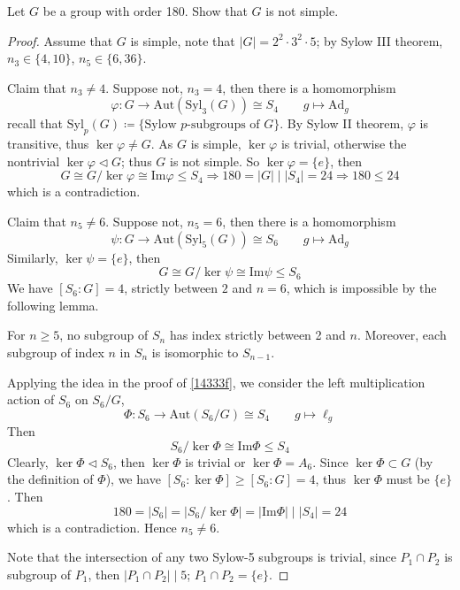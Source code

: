 \begin{exercise}
Let $G$ be a group with order 180. Show that $G$ is not simple.
\end{exercise}
\begin{proof}
Assume that $G$ is simple, note that $\lvert G \rvert=2^{2}\cdot3^2\cdot5$; by Sylow III theorem, $n_3\in \{ 4,10 \}$, $n_5\in \{ 6,36 \}$.

Claim that $n_3\neq4$. Suppose not, $n_3=4$, then there is a homomorphism
\[
\varphi:G\to \mathrm{Aut}(\mathrm{Syl}_{3}(G))\cong S_4\qquad g\mapsto \mathrm{Ad}_{g}
\]
recall that $\mathrm{Syl}_{p}(G)\coloneqq \{ \text{Sylow }p\text{-subgroups of }G \}$. By Sylow II theorem, $\varphi$ is transitive, thus $\ker\varphi\neq G$. As $G$ is simple, $\ker\varphi$ is trivial, otherwise the nontrivial $\ker\varphi\lhd G$; thus $G$ is not simple. So $\ker\varphi=\{ e \}$, then
\[
G\cong G/\ker\varphi\cong\mathrm{Im}\varphi\leq S_4\Rightarrow 180= \lvert G \rvert \mid \lvert S_4 \rvert =24\Rightarrow180\leq 24
\]
which is a contradiction.

Claim that $n_5\neq6$. Suppose not, $n_5=6$, then there is a homomorphism
\[
\psi:G\to \mathrm{Aut}(\mathrm{Syl}_{5}(G))\cong S_6\qquad g\mapsto \mathrm{Ad}_{g}
\]
Similarly, $\ker \psi=\{ e \}$, then
\[
G\cong G/\ker \psi \cong \mathrm{Im}\psi\leq S_6
\]
We have $[S_6:G]=4$, strictly between $2$ and $n=6$, which is impossible by the following lemma.

\begin{lemma}
For $n \geq 5$, no subgroup of $S_n$ has index strictly between 2 and $n$. Moreover, each subgroup of index $n$ in $S_n$ is isomorphic to $S_{n-1}$.\label{14333f}
\end{lemma}

Applying the idea in the proof of \cref{14333f}, we consider the left multiplication action of $S_6$ on $S_6/G$,
\[
\Phi:S_6\to \mathrm{Aut}(S_6/G)\cong S_4\qquad g\mapsto \ell_{g}
\]
Then
\[
S_6/\ker \Phi \cong \mathrm{Im}\Phi\leq S_4
\]
Clearly, $\ker \Phi\lhd S_6$, then $\ker \Phi$ is trivial or $\ker \Phi=A_6$. Since $\ker \Phi \subset G$ (by the definition of $\Phi$), we have $[S_6:\ker \Phi]\geq[S_6:G]=4$, thus $\ker \Phi$ must be $\{ e \}$. Then
\[
180=\lvert S_6 \rvert =\lvert S_6/\ker \Phi \rvert =\lvert \mathrm{Im}\Phi \rvert \mid \lvert S_4 \rvert =24 
\]
which is a contradiction. Hence $n_5\neq6$.

Note that the intersection of any two Sylow-5 subgroups is trivial, since $P_1\cap P_2$ is subgroup of $P_1$, then $\lvert P_1\cap P_2 \rvert \mid5$; $P_1\cap P_2=\{ e \}$.


\end{proof}
